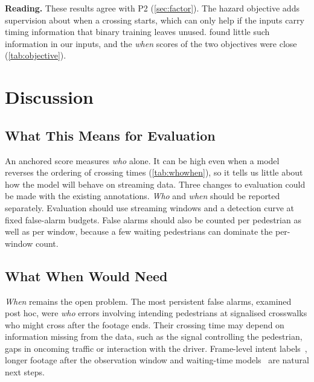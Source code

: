 \documentclass[10pt,a4paper,twocolumn]{article}
\begin{document}
\textbf{Reading.} These results agree with P2 (\cref{sec:factor}). The hazard
objective adds supervision about when a crossing starts, which can only help
if the inputs carry timing information that binary training leaves unused.
 found little such information in our inputs, and the
\emph{when} scores of the two objectives were close (\cref{tab:objective}).

\section{Discussion}
\label{sec:discussion}

\subsection{What This Means for Evaluation}
An anchored score measures \emph{who} alone. It can be high even when a model
reverses the ordering of crossing times (\cref{tab:whowhen}), so it tells us
little about how the model will behave on streaming data. Three changes to
evaluation could be made with the existing annotations. \emph{Who} and
\emph{when} should be reported separately. Evaluation should use streaming
windows and a detection curve at fixed false-alarm budgets. False alarms
should also be counted per pedestrian as well as per window, because a few
waiting pedestrians can dominate the per-window count.

\subsection{What When Would Need}
\emph{When} remains the open problem. The most persistent false alarms,
examined post hoc, were \emph{who} errors involving intending pedestrians at signalised
crosswalks who might cross after the footage ends. Their crossing time may
depend on information missing from the data, such as the signal controlling
the pedestrian, gaps in oncoming traffic or interaction with the driver.
Frame-level intent labels~\cite{jing2025psi}, longer footage after the
observation window and waiting-time
models~\cite{hamed2001waiting,li2013waiting,aft2015waiting} are natural next
steps.
\end{document}
